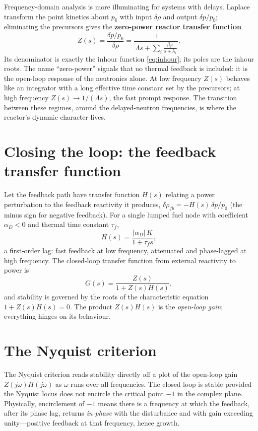 Frequency-domain analysis is more illuminating for systems with delays. Laplace
transform the point kinetics about $p_0$ with input $\delta\rho$ and output
$\delta p/p_0$; eliminating the precursors gives the \textbf{zero-power reactor
transfer function}
\begin{equation}
Z(s) = \frac{\delta p/p_0}{\delta\rho}
     = \frac{1}{\,\Lambda s + \displaystyle\sum_{i}\frac{\beta_i s}{s+\lambda_i}\,}.
\label{eq:zpr}
\end{equation}
Its denominator is exactly the inhour function \eqref{eq:inhour}; its poles are
the inhour roots. The name ``zero-power'' signals that no thermal feedback is
included: it is the open-loop response of the neutronics alone. At low frequency
$Z(s)$ behaves like an integrator with a long effective time constant set by the
precursors; at high frequency $Z(s)\to 1/(\Lambda s)$, the fast prompt response.
The transition between these regimes, around the delayed-neutron frequencies, is
where the reactor's dynamic character lives.

\section{Closing the loop: the feedback transfer function}

Let the feedback path have transfer function $H(s)$ relating a power perturbation
to the feedback reactivity it produces, $\delta\rho_{fb}=-H(s)\,\delta p/p_0$
(the minus sign for negative feedback). For a single lumped fuel node with
coefficient $\alpha_D<0$ and thermal time constant $\tau_f$,
\begin{equation}
H(s) = \frac{|\alpha_D|\,K}{1+\tau_f s},
\end{equation}
a first-order lag: fast feedback at low frequency, attenuated and phase-lagged at
high frequency. The closed-loop transfer function from external reactivity to
power is
\begin{equation}
G(s) = \frac{Z(s)}{1 + Z(s)H(s)},
\end{equation}
and stability is governed by the roots of the characteristic equation
$1+Z(s)H(s)=0$. The product $Z(s)H(s)$ is the \emph{open-loop gain}; everything
hinges on its behaviour.

\section{The Nyquist criterion}

The Nyquist criterion reads stability directly off a plot of the open-loop gain
$Z(j\omega)H(j\omega)$ as $\omega$ runs over all frequencies. The closed loop is
stable provided the Nyquist locus does not encircle the critical point $-1$ in the
complex plane. Physically, encirclement of $-1$ means there is a frequency at
which the feedback, after its phase lag, returns \emph{in phase} with the
disturbance and with gain exceeding unity---positive feedback at that frequency,
hence growth.

